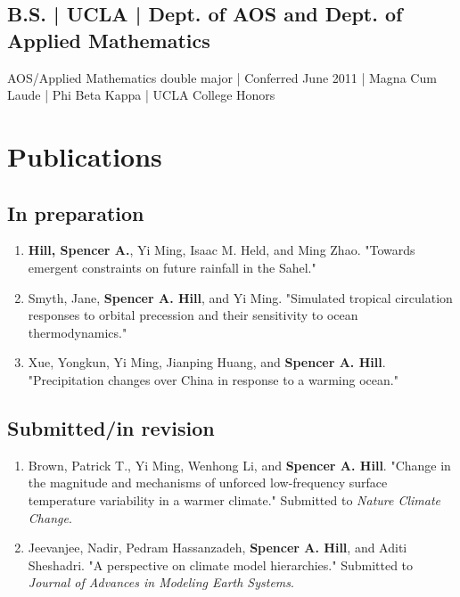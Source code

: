\documentclass[12pt,letterpaper]{shillcv}
\begin{document}
\subsection*{B.S. | UCLA | Dept. of AOS and Dept. of Applied Mathematics}
\label{sec:org844752f}
AOS/Applied Mathematics double major | Conferred June 2011 |
Magna Cum Laude | Phi Beta Kappa | UCLA College Honors
\section*{Publications}
\label{sec:org4583fc7}
\subsection*{In preparation}
\label{sec:org5a63a61}
\begin{enumerate}
\item \textbf{Hill, Spencer A.}, Yi Ming, Isaac M. Held, and Ming Zhao.  "Towards emergent
constraints on future rainfall in the Sahel."
\item Smyth, Jane, \textbf{Spencer A. Hill}, and Yi Ming.  "Simulated tropical circulation
responses to orbital precession and their sensitivity to ocean thermodynamics."
\item Xue, Yongkun, Yi Ming, Jianping Huang, and \textbf{Spencer A. Hill}.  "Precipitation
changes over China in response to a warming ocean."
\end{enumerate}
\subsection*{Submitted/in revision}
\label{sec:orgee54d37}
\begin{enumerate}
\item Brown, Patrick T., Yi Ming, Wenhong Li, and \textbf{Spencer A. Hill}.  "Change in the
magnitude and mechanisms of unforced low-frequency surface temperature
variability in a warmer climate."  Submitted to \emph{Nature Climate Change}.
\item Jeevanjee, Nadir, Pedram Hassanzadeh, \textbf{Spencer A. Hill}, and Aditi Sheshadri.
"A perspective on climate model hierarchies."  Submitted to \emph{Journal of
Advances in Modeling Earth Systems}.
\end{enumerate}
\end{document}

